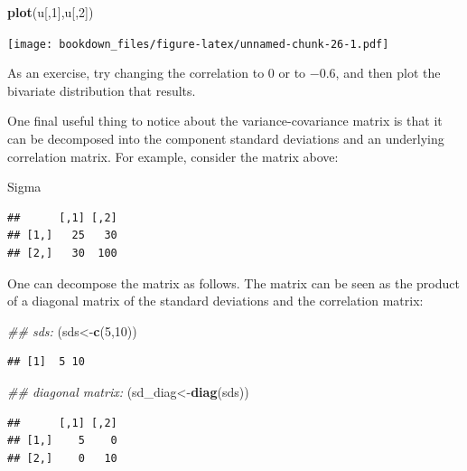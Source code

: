 \documentclass[12pt,]{krantz}
\newenvironment{Shaded}{\begin{snugshade}}{\end{snugshade}}
\newcommand{\CommentTok}[1]{\textcolor[rgb]{0.56,0.35,0.01}{\textit{#1}}}
\newcommand{\DecValTok}[1]{\textcolor[rgb]{0.00,0.00,0.81}{#1}}
\newcommand{\KeywordTok}[1]{\textcolor[rgb]{0.13,0.29,0.53}{\textbf{#1}}}
\newcommand{\NormalTok}[1]{#1}
\theoremstyle{definition}
\theoremstyle{definition}
\theoremstyle{definition}
\theoremstyle{remark}
\begin{document}
\begin{Shaded}
\begin{Highlighting}[]
\KeywordTok{plot}\NormalTok{(u[,}\DecValTok{1}\NormalTok{],u[,}\DecValTok{2}\NormalTok{])}
\end{Highlighting}
\end{Shaded}

\texttt{[image: bookdown\_files/figure-latex/unnamed-chunk-26-1.pdf]}

As an exercise, try changing the correlation to \(0\) or to \(-0.6\), and then plot the bivariate distribution that results.

One final useful thing to notice about the variance-covariance matrix is that it can be decomposed into the component standard deviations and an underlying correlation matrix. For example, consider the matrix above:

\begin{Shaded}
\begin{Highlighting}[]
\NormalTok{Sigma}
\end{Highlighting}
\end{Shaded}

\begin{verbatim}
##      [,1] [,2]
## [1,]   25   30
## [2,]   30  100
\end{verbatim}

One can decompose the matrix as follows. The matrix can be seen as the product of a diagonal matrix of the standard deviations and the correlation matrix:

\begin{Shaded}
\begin{Highlighting}[]
\CommentTok{## sds:}
\NormalTok{(sds<-}\KeywordTok{c}\NormalTok{(}\DecValTok{5}\NormalTok{,}\DecValTok{10}\NormalTok{))}
\end{Highlighting}
\end{Shaded}

\begin{verbatim}
## [1]  5 10
\end{verbatim}

\begin{Shaded}
\begin{Highlighting}[]
\CommentTok{## diagonal matrix:}
\NormalTok{(sd_diag<-}\KeywordTok{diag}\NormalTok{(sds))}
\end{Highlighting}
\end{Shaded}

\begin{verbatim}
##      [,1] [,2]
## [1,]    5    0
## [2,]    0   10
\end{verbatim}
\end{document}
